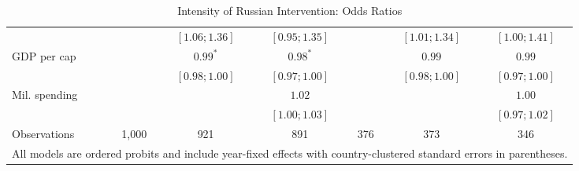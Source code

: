\begin{table}[h!]
\begin{center}
\begin{tabular}{l c c c c c c}
                      &                 & $ [1.06; 1.36]$ & $ [0.95; 1.35]$ &                 & $ [1.01; 1.34]$ & $ [1.00; 1.41]$ \\
\quad GDP per cap     &                 & $0.99^{*}$      & $0.98^{*}$      &                 & $0.99$          & $0.99$          \\
                      &                 & $ [0.98; 1.00]$ & $ [0.97; 1.00]$ &                 & $ [0.98; 1.00]$ & $ [0.97; 1.00]$ \\
\quad Mil. spending   &                 &                 & $1.02$          &                 &                 & $1.00$          \\
                      &                 &                 & $ [1.00; 1.03]$ &                 &                 & $ [0.97; 1.02]$ \\
\hline
Observations          & 1,000           & 921             & 891             & 376             & 373             & 346             \\
\hline
\multicolumn{7}{l}{\scriptsize{All models are ordered probits and include year-fixed effects with country-clustered standard errors in parentheses.}}
\end{tabular}
\caption{Intensity of Russian Intervention: Odds Ratios}
\label{table:coefficients}
\end{center}
\end{table}
